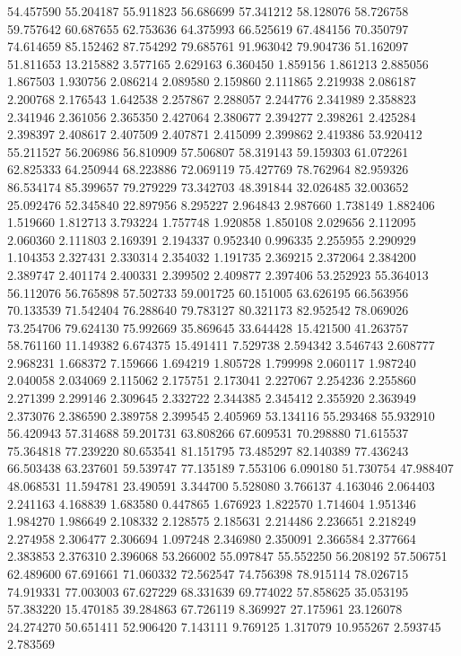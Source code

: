 54.457590
55.204187
55.911823
56.686699
57.341212
58.128076
58.726758
59.757642
60.687655
62.753636
64.375993
66.525619
67.484156
70.350797
74.614659
85.152462
87.754292
79.685761
91.963042
79.904736
51.162097
51.811653
13.215882
3.577165
2.629163
6.360450
1.859156
1.861213
2.885056
1.867503
1.930756
2.086214
2.089580
2.159860
2.111865
2.219938
2.086187
2.200768
2.176543
1.642538
2.257867
2.288057
2.244776
2.341989
2.358823
2.341946
2.361056
2.365350
2.427064
2.380677
2.394277
2.398261
2.425284
2.398397
2.408617
2.407509
2.407871
2.415099
2.399862
2.419386
53.920412
55.211527
56.206986
56.810909
57.506807
58.319143
59.159303
61.072261
62.825333
64.250944
68.223886
72.069119
75.427769
78.762964
82.959326
86.534174
85.399657
79.279229
73.342703
48.391844
32.026485
32.003652
25.092476
52.345840
22.897956
8.295227
2.964843
2.987660
1.738149
1.882406
1.519660
1.812713
3.793224
1.757748
1.920858
1.850108
2.029656
2.112095
2.060360
2.111803
2.169391
2.194337
0.952340
0.996335
2.255955
2.290929
1.104353
2.327431
2.330314
2.354032
1.191735
2.369215
2.372064
2.384200
2.389747
2.401174
2.400331
2.399502
2.409877
2.397406
53.252923
55.364013
56.112076
56.765898
57.502733
59.001725
60.151005
63.626195
66.563956
70.133539
71.542404
76.288640
79.783127
80.321173
82.952542
78.069026
73.254706
79.624130
75.992669
35.869645
33.644428
15.421500
41.263757
58.761160
11.149382
6.674375
15.491411
7.529738
2.594342
3.546743
2.608777
2.968231
1.668372
7.159666
1.694219
1.805728
1.799998
2.060117
1.987240
2.040058
2.034069
2.115062
2.175751
2.173041
2.227067
2.254236
2.255860
2.271399
2.299146
2.309645
2.332722
2.344385
2.345412
2.355920
2.363949
2.373076
2.386590
2.389758
2.399545
2.405969
53.134116
55.293468
55.932910
56.420943
57.314688
59.201731
63.808266
67.609531
70.298880
71.615537
75.364818
77.239220
80.653541
81.151795
73.485297
82.140389
77.436243
66.503438
63.237601
59.539747
77.135189
7.553106
6.090180
51.730754
47.988407
48.068531
11.594781
23.490591
3.344700
5.528080
3.766137
4.163046
2.064403
2.241163
4.168839
1.683580
0.447865
1.676923
1.822570
1.714604
1.951346
1.984270
1.986649
2.108332
2.128575
2.185631
2.214486
2.236651
2.218249
2.274958
2.306477
2.306694
1.097248
2.346980
2.350091
2.366584
2.377664
2.383853
2.376310
2.396068
53.266002
55.097847
55.552250
56.208192
57.506751
62.489600
67.691661
71.060332
72.562547
74.756398
78.915114
78.026715
74.919331
77.003003
67.627229
68.331639
69.774022
57.858625
35.053195
57.383220
15.470185
39.284863
67.726119
8.369927
27.175961
23.126078
24.274270
50.651411
52.906420
7.143111
9.769125
1.317079
10.955267
2.593745
2.783569
